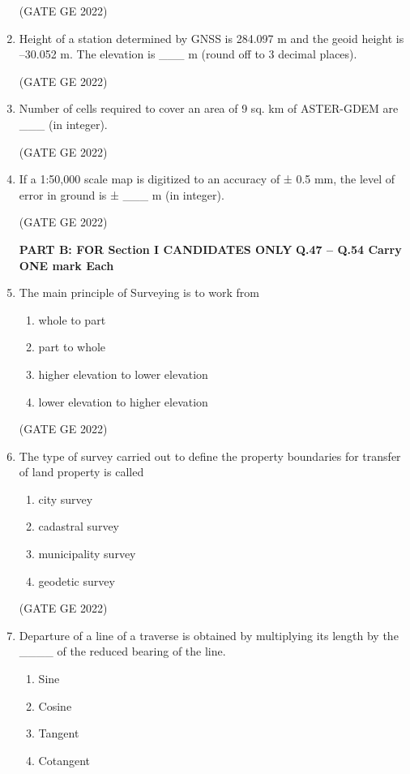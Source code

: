 \documentclass[a4paper, 11pt]{article}
\begin{document}
\begin{enumerate}
\hfill (GATE GE 2022)

\item Height of a station determined by GNSS is 284.097 m and the geoid height is –30.052 m. The elevation is \_\_\_ m (round off to 3 decimal places).

\hfill (GATE GE 2022)

\item Number of cells required to cover an area of 9 sq. km of ASTER-GDEM are \_\_\_ (in integer).

\hfill (GATE GE 2022)

\item If a 1:50,000 scale map is digitized to an accuracy of ± 0.5 mm, the level of error in ground is ± \_\_\_ m (in integer).

\hfill (GATE GE 2022)

\textbf{PART B: FOR Section I CANDIDATES ONLY}
\textbf{Q.47 – Q.54 Carry ONE mark Each}

\item The main principle of Surveying is to work from
\begin{enumerate}
    \item whole to part
    \item part to whole
    \item higher elevation to lower elevation
    \item lower elevation to higher elevation
\end{enumerate}

\hfill (GATE GE 2022)

\item The type of survey carried out to define the property boundaries for transfer of land property is called
\begin{enumerate}
    \item city survey
    \item cadastral survey
    \item municipality survey
    \item geodetic survey
\end{enumerate}

\hfill (GATE GE 2022)

\item Departure of a line of a traverse is obtained by multiplying its length by the \_\_\_\_ of the reduced bearing of the line.
\begin{enumerate}
    \item Sine
    \item Cosine
    \item Tangent
    \item Cotangent
\end{enumerate}


\end{enumerate}
\end{document}
